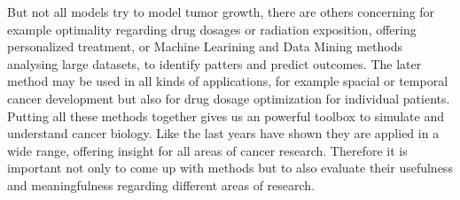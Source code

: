 But not all models try to model tumor growth, there are others concerning for example optimality regarding drug dosages or radiation exposition, offering personalized treatment, or Machine Learining and Data Mining methods analysing large datasets, to identify patters and predict outcomes. The later method may be used in all kinds of applications, for example spacial or temporal cancer development but also for drug dosage optimization for individual patients. Putting all these methods together gives us an powerful toolbox to simulate and understand cancer biology. Like the last years have shown they are applied in a wide range, offering insight for all areas of cancer research. Therefore it is important not only to come up with methods but to also evaluate their usefulness and meaningfulness regarding different areas of research.
